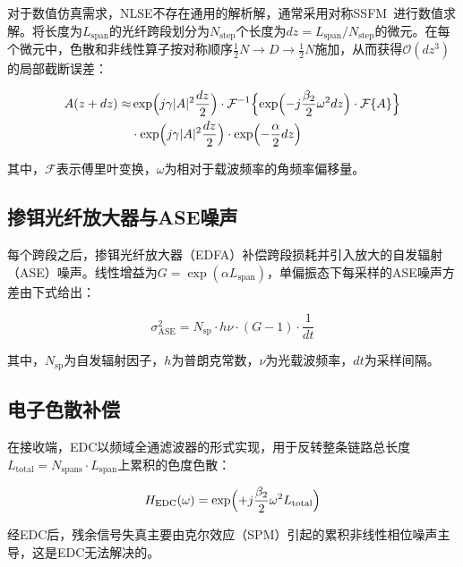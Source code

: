 \documentclass[conference]{IEEEtran}
\begin{document}
对于数值仿真需求，NLSE不存在通用的解析解，通常采用对称SSFM~\cite{agrawal2001}进行数值求解。将长度为$L_{\text{span}}$的光纤跨段划分为$N_{\text{step}}$个长度为$dz = L_{\text{span}} / N_{\text{step}}$的微元。在每个微元中，色散和非线性算子按对称顺序$\frac{1}{2}N \to D \to \frac{1}{2}N$施加，从而获得$\mathcal{O}(dz^3)$的局部截断误差：

\begin{equation}
\begin{aligned}
A(z + dz) \approx &
\exp\Bigl(j\gamma|A|^2 \frac{dz}{2}\Bigr)
\cdot \mathcal{F}^{-1}\Bigl\{\exp\Bigl(-j\frac{\beta_2}{2}\omega^2 dz\Bigr)
\cdot \mathcal{F}\{A\}\Bigr\} \\
& \cdot \exp\Bigl(j\gamma|A|^2 \frac{dz}{2}\Bigr)
\cdot \exp\Bigl(-\frac{\alpha}{2} dz\Bigr)
\end{aligned}
\label{eq:ssfm}
\end{equation}

其中，$\mathcal{F}$表示傅里叶变换，$\omega$为相对于载波频率的角频率偏移量。

\subsection{掺铒光纤放大器与ASE噪声}

每个跨段之后，掺铒光纤放大器（EDFA）补偿跨段损耗并引入放大的自发辐射（ASE）噪声。线性增益为$G = \exp(\alpha L_{\text{span}})$，单偏振态下每采样的ASE噪声方差由下式给出：

\begin{equation}
\sigma_{\text{ASE}}^2 = N_{\text{sp}} \cdot h \nu \cdot (G - 1) \cdot \frac{1}{dt}
\label{eq:ase}
\end{equation}

其中，$N_{\text{sp}}$为自发辐射因子，$h$为普朗克常数，$\nu$为光载波频率，$dt$为采样间隔。

\subsection{电子色散补偿}

在接收端，EDC以频域全通滤波器的形式实现，用于反转整条链路总长度$L_{\text{total}} = N_{\text{spans}} \cdot L_{\text{span}}$上累积的色度色散：

\begin{equation}
H_{\text{EDC}}(\omega) = \exp\Bigl(+j\frac{\beta_2}{2}\omega^2 L_{\text{total}}\Bigr)
\label{eq:edc}
\end{equation}

经EDC后，残余信号失真主要由克尔效应（SPM）引起的累积非线性相位噪声主导，这是EDC无法解决的。
\end{document}
